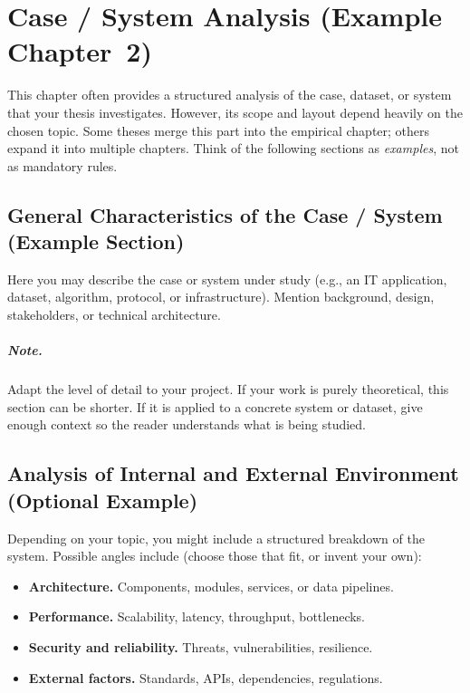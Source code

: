 \chapter{Case / System Analysis (Example Chapter~2)}
\label{chap:analysis}


This chapter often provides a structured analysis of the case, dataset, or system that your thesis investigates.  
However, its scope and layout depend heavily on the chosen topic. Some theses merge this part into the empirical chapter; others expand it into multiple chapters.  
Think of the following sections as \emph{examples}, not as mandatory rules.

\section{General Characteristics of the Case / System (Example Section)}
\label{sec:case}
Here you may describe the case or system under study (e.g., an IT application, dataset, algorithm, protocol, or infrastructure).  
Mention background, design, stakeholders, or technical architecture.  

\paragraph{Note.} Adapt the level of detail to your project.  
If your work is purely theoretical, this section can be shorter. If it is applied to a concrete system or dataset, give enough context so the reader understands what is being studied.

\section{Analysis of Internal and External Environment (Optional Example)}
\label{sec:env}
Depending on your topic, you might include a structured breakdown of the system.  
Possible angles include (choose those that fit, or invent your own):

\begin{itemize}[leftmargin=1.2cm]
  \item \textbf{Architecture.} Components, modules, services, or data pipelines.
  \item \textbf{Performance.} Scalability, latency, throughput, bottlenecks.
  \item \textbf{Security and reliability.} Threats, vulnerabilities, resilience.
  \item \textbf{External factors.} Standards, APIs, dependencies, regulations.
\end{itemize}

